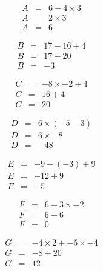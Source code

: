 \documentclass[12pt]{article}
\begin{document}
\begin{multicols}{3}

  \begin{eqnarray*}
    A &=& 6 - 4 \times 3 \\
    A &=& 2 \times 3     \\
    A &=& 6 
  \end{eqnarray*}

\vspace{-0.5cm}

  \begin{eqnarray*}
    B &=& 17 - 16 + 4  \\
    B &=& 17 - 20      \\
    B &=& -3
  \end{eqnarray*}

\vspace{-0.5cm}

  \begin{eqnarray*}
    C &=& -8 \times -2 + 4 \\
    C &=& 16 + 4           \\
    C &=& 20
  \end{eqnarray*}

\vspace{-0.5cm}

  \begin{eqnarray*}
    D &=& 6 \times (-5 - 3) \\
    D &=& 6 \times -8       \\
    D &=& -48
  \end{eqnarray*}

\vspace{-0.5cm}

  \begin{eqnarray*}
    E &=& -9 - (-3) + 9 \\
    E &=& -12 + 9       \\
    E &=& -5
  \end{eqnarray*}

\vspace{-0.5cm}

  \begin{eqnarray*}
    F &=& 6 - 3 \times -2 \\
    F &=& 6 - 6           \\
    F &=& 0
  \end{eqnarray*}

\vspace{-0.5cm}

  \begin{eqnarray*}
    G &=& -4 \times 2 + -5 \times -4 \\
    G &=& -8 + 20                    \\
    G &=& 12 
  \end{eqnarray*}


\end{multicols}
\end{document}
